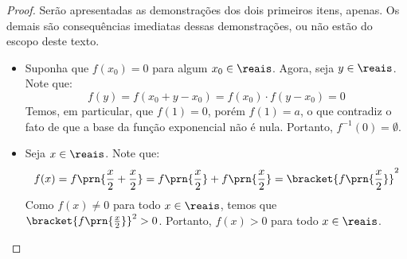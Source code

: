 \begin{proof}
    Serão apresentadas as demonstrações dos dois primeiros itens, apenas. Os demais são consequências 
    imediatas dessas demonstrações, ou não estão do escopo deste texto.
    \begin{itemize}
        \item Suponha que $f(x_0) = 0$ para algum $x_0 \in \reais$.
        Agora, seja $y \in \reais$. Note que:
        $$f(y) = f(x_0 + y - x_0) = f(x_0)\cdot f(y-x_0) = 0$$ 
        Temos, em particular, que $f(1)=0$, porém $f(1) = a$, o que contradiz
        o fato de que a base da função exponencial não é nula. 
        Portanto, $f^{-1}(0) = \emptyset$.

        \item Seja $x \in \reais$. Note que:
        $$f(x) = f\prn{\frac{x}{2} + \frac{x}{2}} = f\prn{\frac{x}{2}}+f\prn{\frac{x}{2}} =\bracket{f\prn{\frac x 2}}^2$$
        Como $f(x) \ne 0$ para todo $x \in \reais$, temos que $\bracket{f\prn{\frac x 2}}^2 > 0$. Portanto, $f(x) > 0$ 
        para todo $x \in \reais$.
    \end{itemize}
\end{proof}